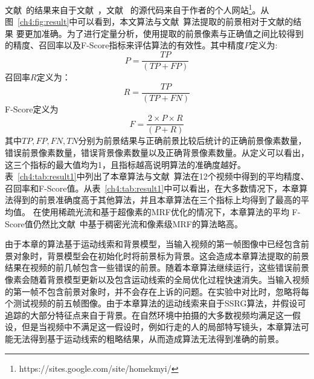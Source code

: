 文献~的结果来自于文献~，文献~ 的源代码来自于作者的个人网站\footnote{https://sites.google.com/site/homekmyi/}。从图~\ref{ch4:fig:result}中可以看到，本文算法与文献~算法提取的前景相对于文献\cite{kwak2011Generalized,5.8s}的结果 要更加准确。为了进行定量分析，使用提取的前景像素与正确值之间比较得到的精度、召回率以及F-Score指标来评估算法的有效性。其中精度$P$定义为:
$$ P = \frac{TP}{(TP+FP)}$$
召回率$R$定义为：
$$R = \frac{TP}{(TP+FN)}$$
F-Score定义为
$$F = \frac{2 \times P \times R}{(P + R)}$$
其中$TP,FP,FN,TN$分别为前景结果与正确前景比较后统计的正确前景像素数量，错误前景像素数量，错误背景像素数量以及正确背景像素数量。从定义可以看出，这三个指标的最大值均为1，且指标越高说明算法的准确度越好。表~\ref{ch4:tab:result1}中列出了本章算法与文献~算法在12个视频中得到的平均精度、召回率和F-Score值。从表~\ref{ch4:tab:result1}中可以看出，在大多数情况下，本章算法得到的前景准确度高于其他算法，并且本章算法在三个指标上均得到了最高的平均值。 在使用稀疏光流和基于超像素的MRF优化的情况下，本章算法的平均 F-Score值仍然比文献~中基于稠密光流和像素级MRF的算法略高。\par

由于本章的算法基于运动线索和背景模型，当输入视频的第一帧图像中已经包含前景对象时，背景模型会在初始化时将前景标为背景。这会造成本章算法提取的前景结果在视频的前几帧包含一些错误的前景。随着本章算法继续运行，这些错误前景像素会随着背景模型更新以及包含运动线索的全局优化过程快速消失。当输入视频的第一帧不包含前景对象时，并不会存在上诉的问题。在实验中对比时，忽略将每个测试视频的前五帧图像。由于本章算法的运动线索来自于SSRG算法，并假设可追踪的大部分特征点来自于背景。在自然环境中拍摄的大多数视频均满足这一假设，但是当视频中不满足这一假设时，例如行走的人的局部特写镜头，本章算法可能无法得到基于运动线索的粗略结果，从而造成算法无法得到准确的前景。\par


